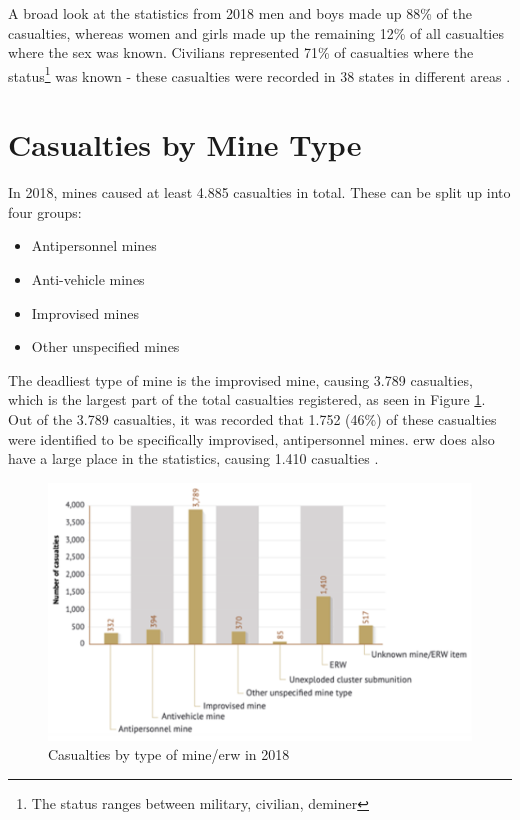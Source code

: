         \vspace{2mm}

A broad look at the statistics from 2018 men and boys made up 88\% of the casualties, whereas women and girls made up the remaining 12\% of all casualties where the sex was known. Civilians represented 71\% of casualties where the status\footnote{The status ranges between military, civilian, deminer} was known - these casualties were recorded in 38 states in different areas \cite{LandmineMonitor2019}.

\section{Casualties by Mine Type}

In 2018, mines caused at least 4.885 casualties in total. These can be split up into four groups: 
\begin{itemize}
    \item Antipersonnel mines
            \vspace{-4mm}
    \item Anti-vehicle mines
            \vspace{-4mm}
    \item Improvised mines
            \vspace{-4mm}
    \item Other unspecified mines
\end{itemize}

The deadliest type of mine is the improvised mine, causing 3.789 casualties, which is the largest part of the total casualties registered, as seen in Figure \ref{fig:casualties_by_type}. Out of the 3.789 casualties, it was recorded that 1.752 (46\%) of these casualties were identified to be specifically improvised, antipersonnel mines. \gls{erw} does also have a large place in the statistics, causing 1.410 casualties \cite{LandmineMonitor2019}.

\begin{figure}[h]
  \centering
  \includegraphics[width=12.5cm]{00 - Images/casualties_by_type.png}
  \caption{Casualties by type of mine/\gls{erw} in 2018 \cite{LandmineMonitor2019}}
  \label{fig:casualties_by_type}
\end{figure}